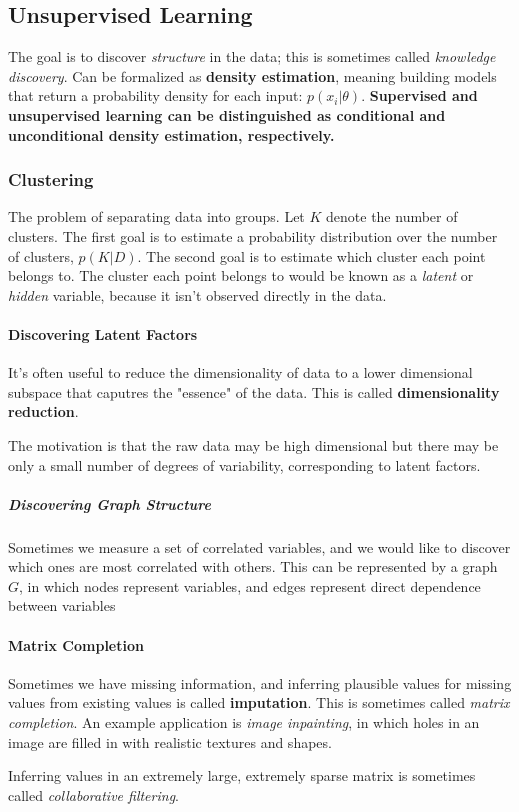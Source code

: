 \documentclass[11pt]{article}
\theoremstyle{definition}
\begin{document}
    \subsection{Unsupervised Learning}
        The goal is to discover \emph{structure} in the data; this is sometimes called \emph{knowledge discovery}.
        Can be formalized as \textbf{density estimation}, meaning building models that return a probability density for each input: $p(x_i|\theta)$.
        \textbf{Supervised and unsupervised learning can be distinguished as conditional and unconditional density estimation, respectively.}
        \subsubsection{Clustering}
            The problem of separating data into groups. Let $K$ denote the number of clusters. The first goal is to estimate a probability distribution over the number of clusters, $p(K|D)$. The second goal is to estimate which cluster each point belongs to. The cluster each point belongs to would be known as a \emph{latent} or \emph{hidden} variable, because it isn't observed directly in the data. 
            \paragraph{Discovering Latent Factors}
                It's often useful to reduce the dimensionality of data to a lower dimensional subspace that caputres the "essence" of the data. This is called \textbf{dimensionality reduction}.

                The motivation is that the raw data may be high dimensional but there may be only a small number of degrees of variability, corresponding to latent factors.
                \subparagraph{Discovering Graph Structure}
                    Sometimes we measure a set of correlated variables, and we would like to discover which ones are most correlated with others. This can be represented by a graph $G$, in which nodes represent variables, and edges represent direct dependence between variables
            \paragraph{Matrix Completion} 
                Sometimes we have missing information, and inferring plausible values for missing values from existing values is called \textbf{imputation}. This is sometimes called \emph{matrix completion}.
                An example application is \emph{image inpainting}, in which holes in an image are filled in with realistic textures and shapes.
                
                Inferring values in an extremely large, extremely sparse matrix is sometimes called \emph{collaborative filtering}.
\end{document}
